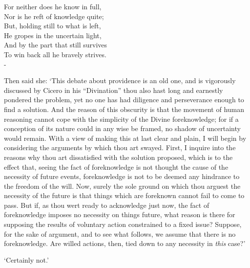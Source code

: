 \documentclass[12pt]{book}
\newenvironment{vpoem}[1]%
  {\def\poemvsindentlines{#1}\begin{poem}\small}%
  {\end{poem}\def\poemvsindentlines{\relax}}
\begin{document}
\begin{vpoem}{24}
    For neither does he know in full, \\
      Nor is he reft of knowledge quite; \\
    But, holding still to what is left, \\
      He gropes in the uncertain light, \\
    And by the part that still survives \\
    To win back all he bravely strives. \\-
\end{vpoem}


Then said she: `This debate about providence is an old one, and is
vigorously discussed by Cicero in his ``Divination'' thou also hast long
and earnestly pondered the problem, yet no one has had diligence and
perseverance enough to find a solution. And the reason of this obscurity
is that the movement of human reasoning cannot cope with the simplicity
of the Divine foreknowledge; for if a conception of its nature could in
any wise be framed, no shadow of uncertainty would remain. With a view
of making this at last clear and plain, I will begin by considering the
arguments by which thou art swayed. First, I inquire into the reasons
why thou art dissatisfied with the solution proposed, which is to the
effect that, seeing the fact of foreknowledge is not thought the cause
of the necessity of future events, foreknowledge is not to be deemed any
hindrance to the freedom of the will. Now, surely the sole ground on
which thou arguest the necessity of the future is that things which are
foreknown cannot fail to come to pass. But if, as thou wert ready to
acknowledge just now, the fact of foreknowledge imposes no necessity on
things future, what reason is there for supposing the results of
voluntary action constrained to a fixed issue? Suppose, for the sake of
argument, and to see what follows, we assume that there is no
foreknowledge. Are willed actions, then, tied down to any necessity in
\emph{this} case?'

`Certainly not.'
\end{document}

